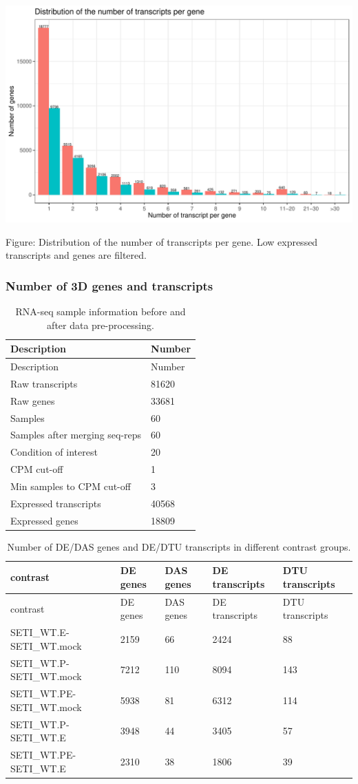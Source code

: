 \documentclass[]{article}
\begin{document}
\includegraphics[width=16.67in]{X2024.08.05.11.24.04.j284/figure/Distribution of the number of transcripts per gene}

Figure: Distribution of the number of transcripts per gene. Low
expressed transcripts and genes are filtered.

\subsubsection{Number of 3D genes and
transcripts}\label{number-of-3d-genes-and-transcripts}

\begin{longtable}[]{@{}ll@{}}
\caption{RNA-seq sample information before and after data
pre-processing.}\tabularnewline
\toprule
Description & Number\tabularnewline
\midrule
\endfirsthead
\toprule
Description & Number\tabularnewline
\midrule
\endhead
Raw transcripts & 81620\tabularnewline
Raw genes & 33681\tabularnewline
Samples & 60\tabularnewline
Samples after merging seq-reps & 60\tabularnewline
Condition of interest & 20\tabularnewline
CPM cut-off & 1\tabularnewline
Min samples to CPM cut-off & 3\tabularnewline
Expressed transcripts & 40568\tabularnewline
Expressed genes & 18809\tabularnewline
\bottomrule
\end{longtable}

\begin{longtable}[]{@{}lllll@{}}
\caption{Number of DE/DAS genes and DE/DTU transcripts in different
contrast groups.}\tabularnewline
\toprule
contrast & DE genes & DAS genes & DE transcripts & DTU
transcripts\tabularnewline
\midrule
\endfirsthead
\toprule
contrast & DE genes & DAS genes & DE transcripts & DTU
transcripts\tabularnewline
\midrule
\endhead
SETI\_WT.E-SETI\_WT.mock & 2159 & 66 & 2424 & 88\tabularnewline
SETI\_WT.P-SETI\_WT.mock & 7212 & 110 & 8094 & 143\tabularnewline
SETI\_WT.PE-SETI\_WT.mock & 5938 & 81 & 6312 & 114\tabularnewline
SETI\_WT.P-SETI\_WT.E & 3948 & 44 & 3405 & 57\tabularnewline
SETI\_WT.PE-SETI\_WT.E & 2310 & 38 & 1806 & 39\tabularnewline
\bottomrule
\end{longtable}
\end{document}
